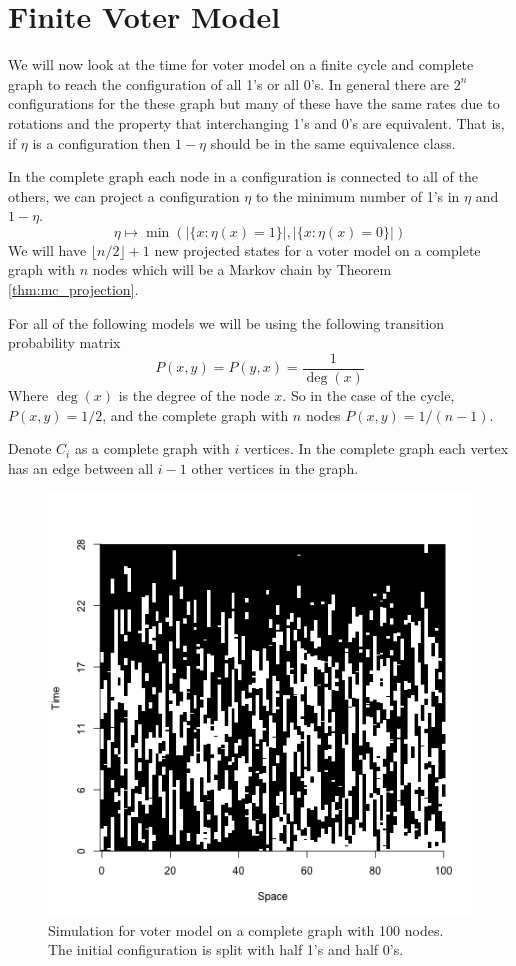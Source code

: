 \section{Finite Voter Model}
We will now look at the time for voter model on a finite cycle and complete graph to reach the configuration of all 1's or all 0's.
In general there are $2^n$ configurations for the these graph but many of these have the same rates due to rotations and the property that interchanging 1's and 0's are equivalent.
That is, if $\eta$ is a configuration then $1 - \eta$ should be in the same equivalence class.

In the complete graph each node in a configuration is connected to all of the others, we can project a configuration $\eta$ to the minimum number of 1's in $\eta$ and $1 - \eta$.
$$
\eta \mapsto \min\left(|\{x : \eta(x) = 1\}|, |\{x : \eta(x) = 0\}|  \right)
$$
We will have $\lfloor n/2 \rfloor + 1$ new projected states for a voter model on a complete graph with $n$ nodes which will be a Markov chain
by Theorem \ref{thm:mc_projection}.

For all of the following models we will be using the following transition probability matrix
$$
P(x,y) = P(y,x) = \frac{1}{\deg(x)}
$$
Where $\deg(x)$ is the degree of the node $x$.
So in the case of the cycle, $P(x,y) = 1/2$, and the complete graph with $n$ nodes $P(x,y) = 1/(n - 1)$.

Denote $C_i$ as a complete graph with $i$ vertices.
In the complete graph each vertex has an edge between all $i - 1$ other vertices in the graph.

\begin{figure}[H]
  \centering
    \includegraphics[width=.80\textwidth]{figures/voter_simulation_1d_complete_split_100.png}
   \caption{Simulation for voter model on a complete graph with 100 nodes. The initial configuration is split with half 1's and half 0's.}
  \label{fig:voter_sim_1d_complete.png}
\end{figure}

